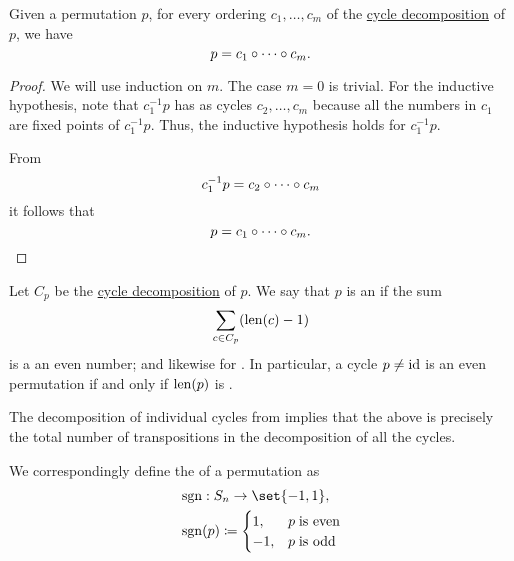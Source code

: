 \begin{proposition}\label{thm:permutation_decomposition}
  Given a permutation \( p \), for every ordering \( c_1, \ldots, c_m \) of the \hyperref[def:permutation_cycle_decomposition]{cycle decomposition} of \( p \), we have
  \begin{equation*}
    p = c_1 \bincirc \cdots \bincirc c_m.
  \end{equation*}
\end{proposition}
\begin{proof}
  We will use induction on \( m \). The case \( m = 0 \) is trivial. For the inductive hypothesis, note that \( c_1^{-1} p \) has as cycles \( c_2, \ldots, c_m \) because all the numbers in \( c_1 \) are fixed points of \( c_1^{-1} p \). Thus, the inductive hypothesis holds for \( c_1^{-1} p \).

  From
  \begin{equation*}
    c_1^{-1} p = c_2 \bincirc \cdots \bincirc c_m
  \end{equation*}
  it follows that
  \begin{equation*}
    p = c_1 \bincirc \cdots \bincirc c_m.
  \end{equation*}
\end{proof}

\begin{definition}\label{def:permutation_parity}
  Let \( C_p \) be the \hyperref[def:permutation_cycle_decomposition]{cycle decomposition} of \( p \). We say that \( p \) is an  if the sum
  \begin{equation*}
    \sum_{c \in C_p} (\operatorname{len}(c) - 1)
  \end{equation*}
  is a an even number; and likewise for . In particular, a cycle \( p \neq \operatorname{id} \) is an even permutation if and only if \( \operatorname{len}(p) \) is .

  The decomposition of individual cycles from  implies that the above is precisely the total number of transpositions in the decomposition of all the cycles.

  We correspondingly define the  of a permutation as
  \begin{equation*}
    \begin{aligned}
       &\sgn: S_n \to \set{ -1, 1 }, \\
       &\sgn(p) \coloneqq \begin{cases}
        1,  &p \T{is even} \\
        -1, &p \T{is odd}
      \end{cases}
    \end{aligned}
  \end{equation*}
\end{definition}

